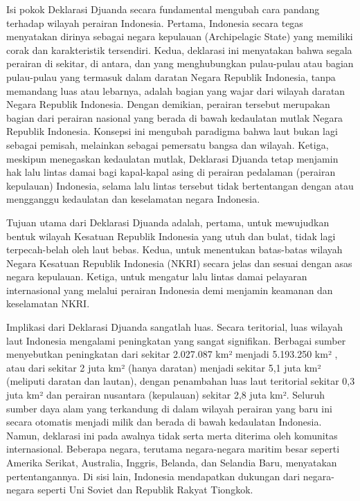 \documentclass[12pt, a4paper]{article}
\begin{document}
Isi pokok Deklarasi Djuanda secara fundamental mengubah cara pandang terhadap wilayah perairan Indonesia. Pertama, Indonesia secara tegas menyatakan dirinya sebagai negara kepulauan (Archipelagic State) yang memiliki corak dan karakteristik tersendiri. Kedua, deklarasi ini menyatakan bahwa segala perairan di sekitar, di antara, dan yang menghubungkan pulau-pulau atau bagian pulau-pulau yang termasuk dalam daratan Negara Republik Indonesia, tanpa memandang luas atau lebarnya, adalah bagian yang wajar dari wilayah daratan Negara Republik Indonesia. Dengan demikian, perairan tersebut merupakan bagian dari perairan nasional yang berada di bawah kedaulatan mutlak Negara Republik Indonesia. Konsepsi ini mengubah paradigma bahwa laut bukan lagi sebagai pemisah, melainkan sebagai pemersatu bangsa dan wilayah. Ketiga, meskipun menegaskan kedaulatan mutlak, Deklarasi Djuanda tetap menjamin hak lalu lintas damai bagi kapal-kapal asing di perairan pedalaman (perairan kepulauan) Indonesia, selama lalu lintas tersebut tidak bertentangan dengan atau mengganggu kedaulatan dan keselamatan negara Indonesia.  

Tujuan utama dari Deklarasi Djuanda adalah, pertama, untuk mewujudkan bentuk wilayah Kesatuan Republik Indonesia yang utuh dan bulat, tidak lagi terpecah-belah oleh laut bebas. Kedua, untuk menentukan batas-batas wilayah Negara Kesatuan Republik Indonesia (NKRI) secara jelas dan sesuai dengan asas negara kepulauan. Ketiga, untuk mengatur lalu lintas damai pelayaran internasional yang melalui perairan Indonesia demi menjamin keamanan dan keselamatan NKRI.  

Implikasi dari Deklarasi Djuanda sangatlah luas. Secara teritorial, luas wilayah laut Indonesia mengalami peningkatan yang sangat signifikan. Berbagai sumber menyebutkan peningkatan dari sekitar 2.027.087 km² menjadi 5.193.250 km² , atau dari sekitar 2 juta km² (hanya daratan) menjadi sekitar 5,1 juta km² (meliputi daratan dan lautan), dengan penambahan luas laut teritorial sekitar 0,3 juta km² dan perairan nusantara (kepulauan) sekitar 2,8 juta km². Seluruh sumber daya alam yang terkandung di dalam wilayah perairan yang baru ini secara otomatis menjadi milik dan berada di bawah kedaulatan Indonesia. Namun, deklarasi ini pada awalnya tidak serta merta diterima oleh komunitas internasional. Beberapa negara, terutama negara-negara maritim besar seperti Amerika Serikat, Australia, Inggris, Belanda, dan Selandia Baru, menyatakan pertentangannya. Di sisi lain, Indonesia mendapatkan dukungan dari negara-negara seperti Uni Soviet dan Republik Rakyat Tiongkok.  
\end{document}
